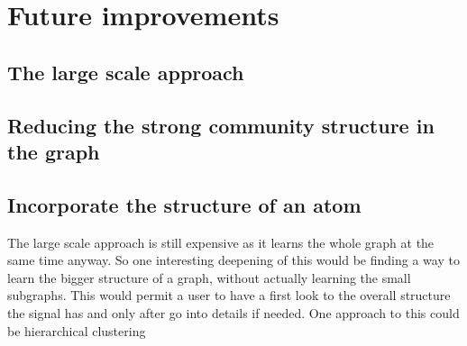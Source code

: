 \chapter{Future improvements}
\section{The large scale approach}
\section{Reducing the strong community structure in the graph}
\section{Incorporate the structure of an atom}
The large scale approach is still expensive as it learns the whole graph at the same time anyway. So one interesting deepening of this would be finding a way to learn the bigger structure of a graph, without actually learning the small subgraphs. This would permit a user to have a first look to the overall structure the signal has and only after go into details if needed. One approach to this could be hierarchical clustering 

